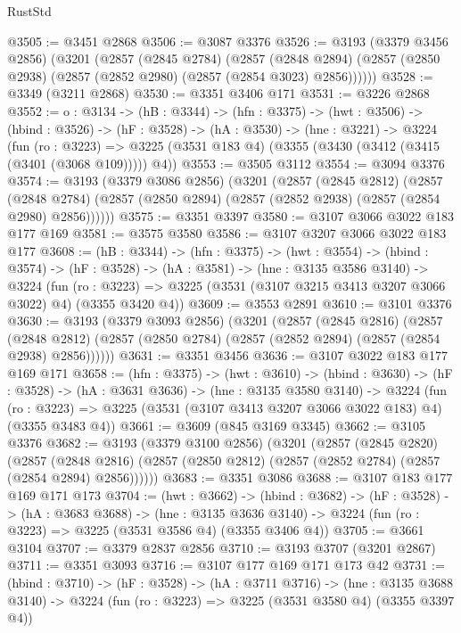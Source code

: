 \begin{lexlean}{RustStd}
\begin{coremodule}
@3505 := @3451 @2868
@3506 := @3087 @3376
@3526 := @3193
    (@3379 @3456 @2856)
    (@3201
      (@2857
        (@2845 @2784)
        (@2857
          (@2848 @2894)
          (@2857 (@2850 @2938) (@2857 (@2852 @2980) (@2857 (@2854 @3023) @2856))))))
@3528 := @3349 (@3211 @2868)
@3530 := @3351 @3406 @171
@3531 := @3226 @2868
@3552 := {o : @3134} ->
  (hB : @3344) ->
  (hfn : @3375) ->
  (hwt : @3506) ->
  (hbind : @3526) ->
  (hF : @3528) ->
  (hA : @3530) ->
  (hne : @3221) ->
  @3224
    (fun (ro : @3223) =>
    @3225 (@3531 @183 @4) (@3355 (@3430 (@3412 (@3415 (@3401 (@3068 @109))))) @4))
@3553 := @3505 @3112
@3554 := @3094 @3376
@3574 := @3193
    (@3379 @3086 @2856)
    (@3201
      (@2857
        (@2845 @2812)
        (@2857
          (@2848 @2784)
          (@2857 (@2850 @2894) (@2857 (@2852 @2938) (@2857 (@2854 @2980) @2856))))))
@3575 := @3351 @3397
@3580 := @3107 @3066 @3022 @183 @177 @169
@3581 := @3575 @3580
@3586 := @3107 @3207 @3066 @3022 @183 @177
@3608 := (hB : @3344) ->
  (hfn : @3375) ->
  (hwt : @3554) ->
  (hbind : @3574) ->
  (hF : @3528) ->
  (hA : @3581) ->
  (hne : @3135 @3586 @3140) ->
  @3224
    (fun (ro : @3223) => @3225 (@3531 (@3107 @3215 @3413 @3207 @3066 @3022) @4) (@3355 @3420 @4))
@3609 := @3553 @2891
@3610 := @3101 @3376
@3630 := @3193
    (@3379 @3093 @2856)
    (@3201
      (@2857
        (@2845 @2816)
        (@2857
          (@2848 @2812)
          (@2857 (@2850 @2784) (@2857 (@2852 @2894) (@2857 (@2854 @2938) @2856))))))
@3631 := @3351 @3456
@3636 := @3107 @3022 @183 @177 @169 @171
@3658 := (hfn : @3375) ->
  (hwt : @3610) ->
  (hbind : @3630) ->
  (hF : @3528) ->
  (hA : @3631 @3636) ->
  (hne : @3135 @3580 @3140) ->
  @3224 (fun (ro : @3223) => @3225 (@3531 (@3107 @3413 @3207 @3066 @3022 @183) @4) (@3355 @3483 @4))
@3661 := @3609 (@845 @3169 @3345)
@3662 := @3105 @3376
@3682 := @3193
    (@3379 @3100 @2856)
    (@3201
      (@2857
        (@2845 @2820)
        (@2857
          (@2848 @2816)
          (@2857 (@2850 @2812) (@2857 (@2852 @2784) (@2857 (@2854 @2894) @2856))))))
@3683 := @3351 @3086
@3688 := @3107 @183 @177 @169 @171 @173
@3704 := (hwt : @3662) ->
  (hbind : @3682) ->
  (hF : @3528) ->
  (hA : @3683 @3688) ->
  (hne : @3135 @3636 @3140) -> @3224 (fun (ro : @3223) => @3225 (@3531 @3586 @4) (@3355 @3406 @4))
@3705 := @3661 @3104
@3707 := @3379 @2837 @2856
@3710 := @3193 @3707 (@3201 @2867)
@3711 := @3351 @3093
@3716 := @3107 @177 @169 @171 @173 @42
@3731 := (hbind : @3710) ->
  (hF : @3528) ->
  (hA : @3711 @3716) ->
  (hne : @3135 @3688 @3140) -> @3224 (fun (ro : @3223) => @3225 (@3531 @3580 @4) (@3355 @3397 @4))

\end{coremodule}
\end{lexlean}
